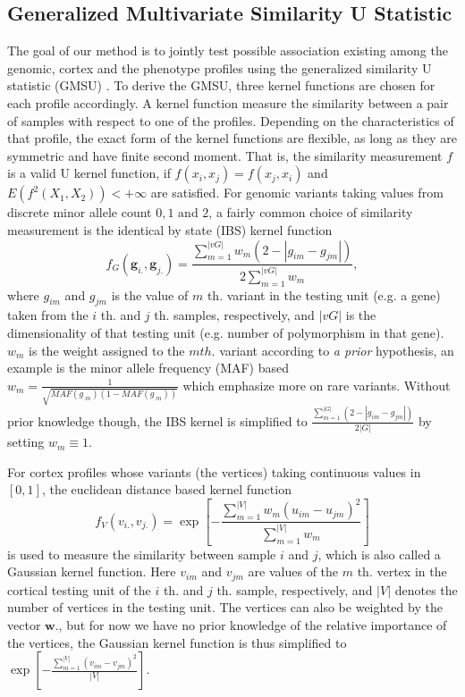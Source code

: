 \subsection{Generalized Multivariate Similarity U Statistic}
The goal of our method is to jointly test possible association existing among the genomic, cortex and the phenotype profiles using the generalized similarity U statistic (GMSU) \cite{UST1, UST2}. To derive the GMSU, three kernel functions are chosen for each profile accordingly. A kernel function measure the similarity between a pair of samples with respect to one of the profiles. Depending on the characteristics of that profile, the exact form of the kernel functions are flexible, as long as they are symmetric and have finite second moment. That is, the similarity measurement $f$ is a valid U kernel function, if $f(x_i,x_j)=f(x_j,x_i)$ and $E(f^2(X_1, X_2))<+\infty$ are satisfied.
\newcommand{\vg}{\boldsymbol{g}}
\newcommand{\vv}{\boldsymbol{v}}
\newcommand{\vy}{\boldsymbol{y}}
\newcommand{\vG}{\boldsymbol{G}}
\newcommand{\vV}{\boldsymbol{V}}
\newcommand{\vY}{\boldsymbol{Y}}
\newcommand{\vq}{\boldsymbol{q}}
For genomic variants taking values from discrete minor allele count ${0, 1 \textrm{ and } 2}$, a fairly common choice of similarity measurement is the identical by state (IBS) kernel function
\label{eq:wSG}
\[ f_G(\vg_{i.}, \vg_{j.}) = \frac{\sum_{m=1}^{|vG|}{w_m(2 - |g_{im} - g_{jm}|)}} {2\sum_{m=1}^{|vG|}{w_m}}, \]
where $g_{im}$ and $g_{jm}$ is the value of $m$ th. variant in the testing unit (e.g. a gene) taken from the $i$ th. and $j$ th. samples, respectively, and $|vG|$ is the dimensionality of that testing unit (e.g. number of polymorphism in that gene). $w_m$ is the weight assigned to the $m th.$ variant according to \textit{a prior} hypothesis, an example is the minor allele frequency (MAF) based $w_m=\frac{1}{\sqrt{MAF(g_{.m})(1-MAF(g_{.m}))}}$ which emphasize more on rare variants. Without prior knowledge though, the IBS kernel is simplified to $\frac{\sum_{m = 1}^{|G|}{(2-|g_{im} - g_{jm}|)}}{2|G|}$ by setting $w_m \equiv 1$.

For cortex profiles whose variants (the vertices) taking continuous values in $[0,1]$, the euclidean distance based kernel function
\label{eq:wSV}
\[ f_V(v_{i.},v_{j.}) = \exp{ [-\frac{\sum_{m=1}^{|V|}{w_m(u_{im}-u_{jm})^2}} {\sum_{m=1}^{|V|}{w_m}}] } \]
is used to measure the similarity between sample $i$ and $j$, which is also called a Gaussian kernel function. Here $v_{im}$ and $v_{jm}$ are values of the $m$ th. vertex in the cortical testing unit of the $i$ th. and $j$ th. sample, respectively, and $|V|$ denotes the number of vertices in the testing unit. The vertices can also be weighted by the vector $\boldsymbol{w}.$, but for now we have no prior knowledge of the relative importance of the vertices, the Gaussian kernel function is thus simplified to $\exp{[-\frac{\sum_{m=1}^{|V|}{(v_{im}-v_{jm})^2}} {|V|}]}$.

